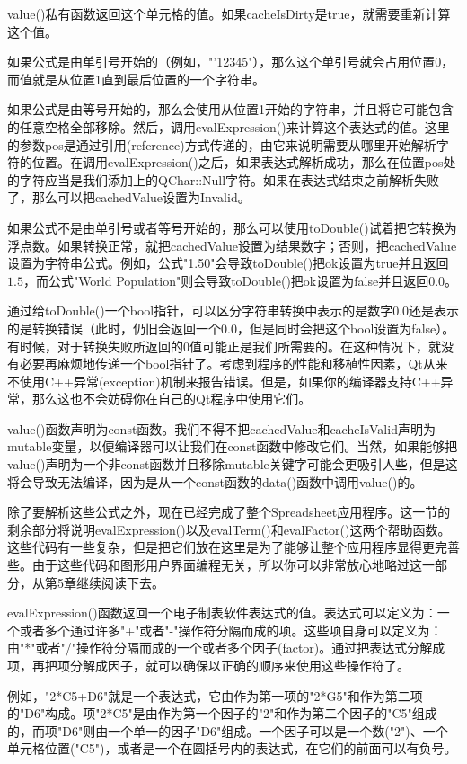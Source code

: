 \documentclass[11pt,oneside]{book}
\begin{document}
\begin{common-format}
value()私有函数返回这个单元格的值。如果cacheIsDirty是true，就需要重新计算这个值。

如果公式是由单引号开始的（例如，"'12345"），那么这个单引号就会占用位置0，而值就是从位置1直到最后位置的一个字符串。

如果公式是由等号开始的，那么会使用从位置1开始的字符串，并且将它可能包含的任意空格全部移除。然后，调用evalExpression()来计算这个表达式的值。这里的参数pos是通过引用(reference)方式传递的，由它来说明需要从哪里开始解析字符的位置。在调用evalExpression()之后，如果表达式解析成功，那么在位置pos处的字符应当是我们添加上的QChar::Null字符。如果在表达式结束之前解析失败了，那么可以把cachedValue设置为Invalid。

如果公式不是由单引号或者等号开始的，那么可以使用toDouble()试着把它转换为浮点数。如果转换正常，就把cachedValue设置为结果数字；否则，把cachedValue设置为字符串公式。例如，公式"1.50"会导致toDouble()把ok设置为true并且返回$ 1.5 $，而公式"World Population"则会导致toDouble()把ok设置为false并且返回$ 0.0 $。

通过给toDouble()一个bool指针，可以区分字符串转换中表示的是数字$ 0.0 $还是表示的是转换错误（此时，仍旧会返回一个$ 0.0 $，但是同时会把这个bool设置为false）。有时候，对于转换失败所返回的0值可能正是我们所需要的。在这种情况下，就没有必要再麻烦地传递一个bool指针了。考虑到程序的性能和移植性因素，Qt从来不使用C++异常(exception)机制来报告错误。但是，如果你的编译器支持C++异常，那么这也不会妨碍你在自己的Qt程序中使用它们。

value()函数声明为const函数。我们不得不把cachedValue和cacheIsValid声明为mutable变量，以便编译器可以让我们在const函数中修改它们。当然，如果能够把value()声明为一个非const函数并且移除mutable关键字可能会更吸引人些，但是这将会导致无法编译，因为是从一个const函数的data()函数中调用value()的。

除了要解析这些公式之外，现在已经完成了整个Spreadsheet应用程序。这一节的剩余部分将说明evalExpression()以及evalTerm()和evalFactor()这两个帮助函数。这些代码有一些复杂，但是把它们放在这里是为了能够让整个应用程序显得更完善些。由于这些代码和图形用户界面编程无关，所以你可以非常放心地略过这一部分，从第5章继续阅读下去。

evalExpression()函数返回一个电子制表软件表达式的值。表达式可以定义为：一个或者多个通过许多"+"或者"-"操作符分隔而成的项。这些项自身可以定义为：由"*"或者"/"操作符分隔而成的一个或者多个因子(factor)。通过把表达式分解成项，再把项分解成因子，就可以确保以正确的顺序来使用这些操作符了。

例如，"2*C5+D6"就是一个表达式，它由作为第一项的"2*G5"和作为第二项的"D6"构成。项"2*C5"是由作为第一个因子的"2"和作为第二个因子的"C5"组成的，而项"D6"则由一个单一的因子"D6"组成。一个因子可以是一个数("2")、一个单元格位置("C5")，或者是一个在圆括号内的表达式，在它们的前面可以有负号。


\end{common-format}
\end{document}
